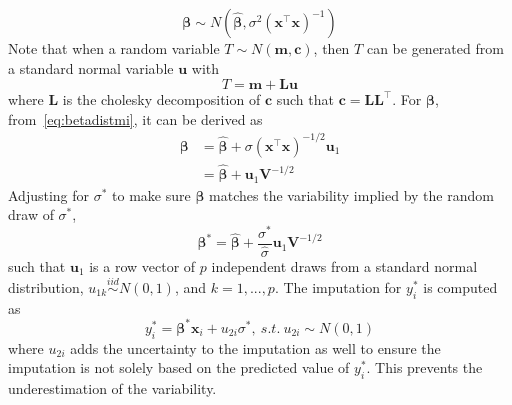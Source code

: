 \documentclass[preprint,12pt]{elsarticle}
\begin{document}
\begin{equation}\label{eq:betadistmi}
    \boldsymbol{\beta}\sim N(\hat{\boldsymbol{\beta}}, \sigma^2(\mathbf{x}^{\top}\mathbf{x})^{-1})
\end{equation}
Note that when a random variable $T\sim N(\mathbf{m}, \mathbf{c})$, then $T$ can be generated from a standard normal variable $\mathbf{u}$ with 
\begin{equation} 
    T=\mathbf{m}+\mathbf{L}\mathbf{u}
\end{equation}
where $\mathbf{L}$ is the cholesky decomposition of $\mathbf{c}$ such that $\mathbf{c}=\mathbf{L}\mathbf{L}^{\top}$.
For $\boldsymbol{\beta}$, from~\ref{eq:betadistmi}, it can be derived as 
\begin{align} 
    \boldsymbol{\beta}&=\hat{\boldsymbol{\beta}}+\sigma (\mathbf{x}^{\top}\mathbf{x})^{-1/2}\mathbf{u}_1\\
    &=\hat{\boldsymbol{\beta}}+\mathbf{u}_1\mathbf{V}^{-1/2}
\end{align}
Adjusting for $\sigma^*$ to make sure $\boldsymbol{\beta}$ matches the variability implied by the random draw of $\sigma^*$, 
\begin{equation} 
    \boldsymbol{\beta}^*=\hat{\boldsymbol{\beta}}+\frac{\sigma^*}{\hat{\sigma}}\mathbf{u}_1\mathbf{V}^{-1/2}
\end{equation}
such that $\mathbf{u}_1$ is a row vector of $p$ independent draws from a standard normal distribution, $u_{1k}\stackrel{iid}{\sim} N(0,1)$, and $k=1,...,p$. 
The imputation for $y_i^*$ is computed as 
\begin{equation} 
    y_i^*=\boldsymbol{\beta}^*\mathbf{x}_i+u_{2i}\sigma^*,~ s.t.~ u_{2i}\sim N(0,1)
\end{equation}
where $u_{2i}$ adds the uncertainty to the imputation as well to ensure the imputation is not solely based on the predicted value of $y_i^*$. 
This prevents the underestimation of the variability. 





\newpage

\end{document}
